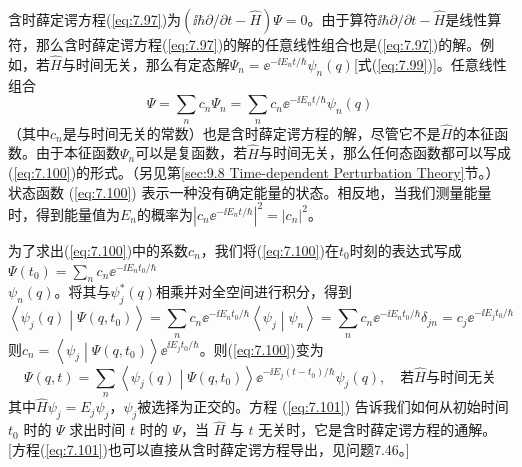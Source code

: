     含时薛定谔方程(\ref{eq:7.97})为$\left(\ii \hbar \partial /\partial t - \hat{H}\right)\Psi = 0$。由于算符$\ii \hbar \partial /\partial t - \hat{H}$是线性算符，那么含时薛定谔方程(\ref{eq:7.97})的解的任意线性组合也是(\ref{eq:7.97})的解。例如，若$\hat{H}$与时间无关，那么有定态解$\Psi_n = \ee ^{-\ii E_nt/\hbar}\psi_n\left(q\right)$[式(\ref{eq:7.99})]。任意线性组合
    \begin{equation}
        \Psi = \sum_{n}c_n\Psi_n = \sum_{n}c_n\ee ^{-\ii E_nt/\hbar}\psi_n\left(q\right)
        \label{eq:7.100}
    \end{equation}
    （其中$c_n$是与时间无关的常数）也是含时薛定谔方程的解，尽管它不是$\hat{H}$的本征函数。由于本征函数$\Psi_n$可以是复函数，若$\hat{H}$与时间无关，那么任何态函数都可以写成(\ref{eq:7.100})的形式。（另见第\ref{sec:9.8 Time-dependent Perturbation Theory}节。）状态函数 (\ref{eq:7.100}) 表示一种没有确定能量的状态。相反地，当我们测量能量时，得到能量值为$E_n$的概率为$\left|c_n\ee ^{-\ii E_nt/\hbar}\right|^2 = \left|c_n\right|^2$。

    为了求出(\ref{eq:7.100})中的系数$c_n$，我们将(\ref{eq:7.100})在$t_0$时刻的表达式写成$\Psi\left(t_0\right) = \sum_{n}c_n\ee ^{-\ii E_nt_0/\hbar}$\\$\psi_n\left(q\right)$。将其与$\psi_j^{\ast}\left(q\right)$相乘并对全空间进行积分，得到
    \begin{equation*}
        \left\langle \psi_j\left(q\right) \middle| \Psi\left(q,t_0\right) \right\rangle = \sum_{n}c_n\ee ^{-\ii E_nt_0/\hbar}\left\langle \psi_j \middle| \psi_n \right\rangle = \sum_{n}c_n\ee ^{-\ii E_nt_0/\hbar}\delta_{jn} = c_j\ee ^{-\ii E_jt_0/\hbar}
    \end{equation*}
    则$c_n = \left\langle \psi_j \middle| \Psi\left(q,t_0\right) \right\rangle \ee ^{\ii E_jt_0/\hbar}$。则(\ref{eq:7.100})变为
    \begin{equation}
        \Psi\left(q,t\right) = \sum_{n}\left\langle \psi_j \left(q\right) \middle| \Psi\left(q,t_0\right) \right\rangle \ee ^{-\ii E_j\left(t-t_0\right)/\hbar}\psi_j\left(q\right), \quad \text{若}\hat{H}\text{与时间无关}
        \label{eq:7.101}
    \end{equation}
    其中$\hat{H}\psi_j = E_j\psi_j$，$\psi_j$被选择为正交的。方程 (\ref{eq:7.101}) 告诉我们如何从初始时间 $t_0$ 时的 $\Psi$ 求出时间 $t$ 时的 $\Psi$，当 $\hat{H}$ 与 $t$ 无关时，它是含时薛定谔方程的通解。[方程(\ref{eq:7.101})也可以直接从含时薛定谔方程导出，见问题7.46。]

